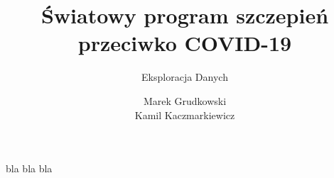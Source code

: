\documentclass[11pt]{beamer}
\author{Marek Grudkowski \\ Kamil Kaczmarkiewicz}
\title{Światowy program szczepień \\ przeciwko COVID-19}
\subtitle{Eksploracja Danych}
\institute{Politechnika Gdańska}
\date{}
\begin{document}
\begin{frame}
\titlepage
\end{frame}



\begin{frame}{bla}
bla bla
\end{frame}
\end{document}
